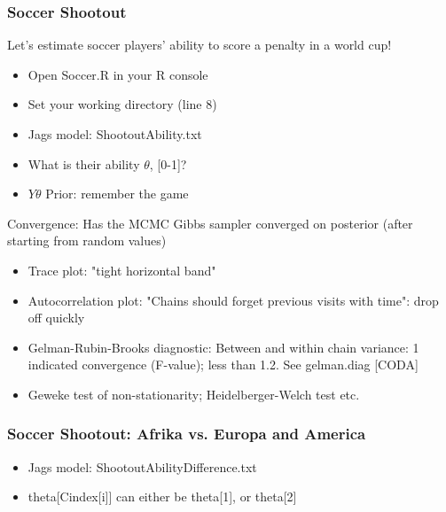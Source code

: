 \documentclass[hyperref={pdfpagelabels=false},unknownkeysallowed]{beamer}
\begin{document}
\begin{frame}
\frametitle{Soccer Shootout}
Let's estimate soccer players' ability to score a penalty in a world cup! 
\begin{itemize}
\item Open Soccer.R in your R console
\item Set your working directory (line 8)
\item Jags model: ShootoutAbility.txt
\item What is their ability $\theta$, [0-1]?
\item $Y\theta$ Prior: remember the game
\end{itemize}
\note{}
\end{frame}


\begin{frame}
Convergence: Has the MCMC Gibbs sampler converged on posterior (after starting from random values)
\begin{itemize}
\item Trace plot: "tight horizontal band"
\item Autocorrelation plot: "Chains should forget previous visits with time": drop off quickly
\item Gelman-Rubin-Brooks diagnostic: Between and within chain variance: 1 indicated convergence (F-value); less than 1.2. See gelman.diag [CODA]
\item Geweke test of non-stationarity; Heidelberger-Welch test etc.
\end{itemize}
\note{}
\end{frame}

\begin{frame}
\frametitle{Soccer Shootout: Afrika vs. Europa and America}
\begin{itemize}
\item Jags model: ShootoutAbilityDifference.txt
\item theta[Cindex[i]] can either be theta[1], or theta[2]
\end{itemize}
\note{}
\end{frame}


\end{document}
